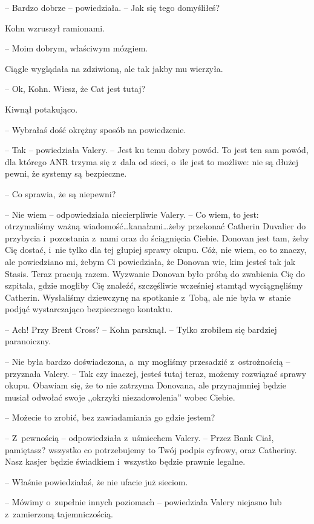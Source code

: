 \documentclass[oneside,polish,11pt,sfheadings]{mwbk}
\begin{document}
-- Bardzo dobrze -- powiedziała. -- Jak się tego
domyśliłeś?

Kohn wzruszył ramionami. 

-- Moim dobrym, właściwym mózgiem.

Ciągle wyglądała na zdziwioną, ale tak jakby mu wierzyła.

-- Ok, Kohn. Wiesz, że Cat jest tutaj?

Kiwnął potakująco. 

-- Wybrałaś dość okrężny sposób na powiedzenie.

-- Tak -- powiedziała Valery. -- Jest ku temu dobry powód. To jest ten sam
powód, dla którego ANR trzyma się z~dala od sieci, o~ile jest to
możliwe: nie są dłużej pewni, że systemy są bezpieczne.

-- Co sprawia, że są niepewni?

-- Nie wiem -- odpowiedziała niecierpliwie Valery. -- Co wiem, to jest:
otrzymaliśmy ważną wiadomość\ldots kanałami\ldots żeby przekonać Catherin
Duvalier do przybycia i~pozostania z~nami oraz do ściągnięcia Ciebie.
Donovan jest tam, żeby Cię dostać, i~nie tylko dla tej głupiej sprawy
okupu. Cóż, nie wiem, co to znaczy, ale powiedziano mi, żebym Ci
powiedziała, że Donovan wie, kim jesteś tak jak Stasis. Teraz pracują
razem. Wyzwanie Donovan było próbą do zwabienia Cię do szpitala, gdzie
mogliby Cię znaleźć, szczęśliwie wcześniej stamtąd wyciągnęliśmy
Catherin. Wysłaliśmy dziewczynę na spotkanie z~Tobą, ale nie była w~stanie podjąć wystarczająco bezpiecznego kontaktu.

-- Ach! Przy Brent Cross? -- Kohn parsknął. -- Tylko zrobiłem się bardziej
paranoiczny.

-- Nie była bardzo doświadczona, a~my mogliśmy przesadzić z~ostrożnością
-- przyznała Valery. -- Tak czy inaczej, jesteś tutaj teraz, możemy
rozwiązać sprawy okupu. Obawiam się, że to nie zatrzyma Donovana, ale
przynajmniej będzie musiał odwołać swoje ,,okrzyki niezadowolenia'' wobec
Ciebie.

-- Możecie to zrobić, bez zawiadamiania go gdzie jestem?

-- Z~pewnością -- odpowiedziała z~uśmiechem Valery. -- Przez Bank Ciał,
pamiętasz? wszyst\-ko co potrzebujemy to Twój podpis cyfrowy, oraz
Catheriny. Nasz kasjer będzie świadkiem i~wszystko będzie prawnie
legalne.

-- Właśnie powiedziałaś, że nie ufacie już sieciom.

-- Mówimy o~zupełnie innych poziomach -- powiedziała Valery niejasno lub z~zamierzoną tajemniczością.
\end{document}
